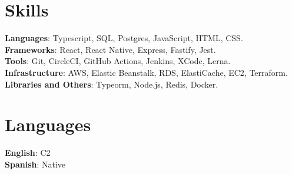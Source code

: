 \documentclass[letterpaper,11pt]{article}
\begin{document}
\begin{minipage}[t]{.7\textwidth}
  \section{Skills}
  \begin{itemize}[leftmargin=0.15in, label={}]
      \small{\item{
      \textbf{Languages}{: Typescript, SQL, Postgres, JavaScript, HTML, CSS.} \\
      \textbf{Frameworks}{: React, React Native, Express, Fastify, Jest.} \\
      \textbf{Tools}{: Git, CircleCI, GitHub Actions, Jenkins, XCode, Lerna.} \\
      \textbf{Infrastructure}{: AWS, Elastic Beanstalk, RDS, ElastiCache, EC2, Terraform.} \\
      \textbf{Libraries and Others}{: Typeorm, Node.js, Redis, Docker.} \\
      }}
  \end{itemize}
 \end{minipage}\hspace{.05\textwidth}%
 \begin{minipage}[t]{.25\textwidth}
  \section{Languages}
  \begin{itemize}[leftmargin=0.15in, label={}]
      \small{\item{
      \textbf{English}{: C2} \\
      \textbf{Spanish}{: Native} \\
      }}
  \end{itemize}
 \end{minipage}

\end{document}
